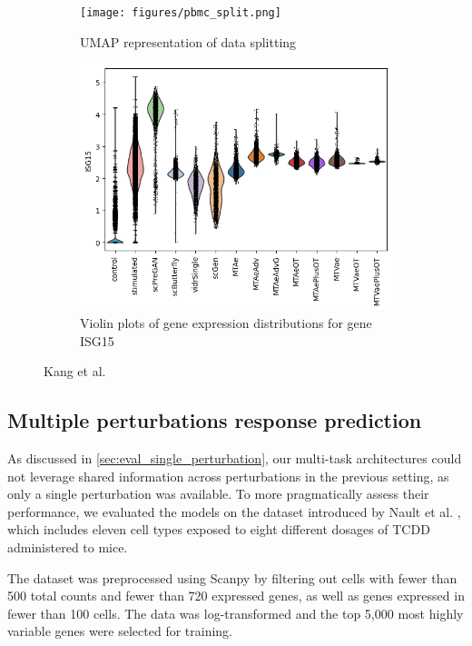 \documentclass[12pt, a4paper]{article}
\begin{document}
\begin{figure}[h!]
    \begin{subfigure}[b]{0.48\textwidth}
        \centering
        \texttt{[image: figures/pbmc\_split.png]}
        \caption{UMAP representation of data splitting}
        \label{}
    \end{subfigure}
    \begin{subfigure}[b]{0.48\textwidth}
        \centering
        \includegraphics[width=.9\textwidth]{violins_pbmc.png}
        \caption{Violin plots of gene expression distributions for gene ISG15}
        \label{}
    \end{subfigure}     
    \caption{Kang et al. \cite{kanaGenerativeModelingSinglecell2023}}
    \label{fig:eval_pbmc}
\end{figure}

\subsection{Multiple perturbations response prediction}

As discussed in \cref{sec:eval_single_perturbation}, our multi-task architectures could not leverage shared information across perturbations in the previous setting, as only a single perturbation was available. To more pragmatically assess their performance, we evaluated the models on the dataset introduced by Nault et al. \cite{nault2021single,nault2022benchmarking}, which includes eleven cell types exposed to eight different dosages of TCDD administered to mice.

The dataset was preprocessed using Scanpy \cite{wolf2018scanpy} by filtering out cells with fewer than 500 total counts and fewer than 720 expressed genes, as well as genes expressed in fewer than 100 cells. The data was log-transformed and the top 5,000 most highly variable genes were selected for training.
\end{document}

